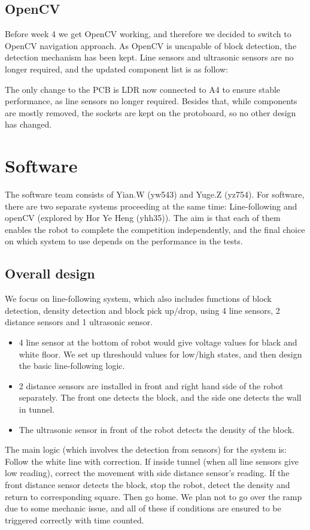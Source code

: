 \documentclass{article}
\begin{document}
\subsection{OpenCV}
\quad Before week 4 we get OpenCV working, and therefore we decided to switch to OpenCV navigation approach. As OpenCV is uncapable of block detection, the detection mechanism has been kept. Line sensors and ultrasonic sensors are no longer required, and the updated component list is as follow:

\quad The only change to the PCB is LDR now connected to A4 to ensure stable performance, as line sensors no longer required. Besides that, while components are mostly removed, the sockets are kept on the protoboard, so no other design has changed.

\section{Software}

\quad The software team consists of Yian.W (yw543) and Yuge.Z (yz754). For software, there are two separate systems proceeding at the same time: Line-following and openCV (explored by Hor Ye Heng (yhh35)). The aim is that each of them enables the robot to complete the competition independently, and the final choice on which system to use depends on the performance in the tests.
\subsection{Overall design}
We focus on line-following system, which also includes functions of block detection, density detection and block pick up/drop, using 4 line sensors, 2 distance sensors and 1 ultrasonic sensor.
\begin{itemize}
    \item 4 line sensor at the bottom of robot would give voltage values for black and white floor. We set up threshould values for low/high states, and then design the basic line-following logic.
    \item 2 distance sensors are installed in front and right hand side of the robot separately. The front one detects the block, and the side one detects the wall in tunnel.
    \item The ultrasonic sensor in front of the robot detects the density of the block.
\end{itemize}

The main logic (which involves the detection from sensors) for the system is: Follow the white line with correction. If inside tunnel (when all line sensors give low reading), correct the movement with side distance sensor's reading.
If the front distance sensor detects the block, stop the robot, detect the density and return to corresponding square. Then go home. We plan not to go over the ramp due to some mechanic issue, and all of these if conditions are ensured to be triggered correctly with time counted.
\end{document}
